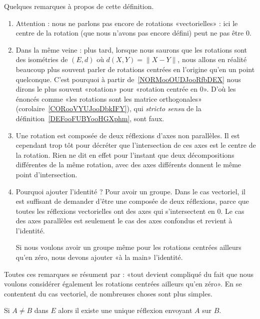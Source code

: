 \begin{normaltext}
	Quelques remarques à propos de cette définition.
	\begin{enumerate}
		\item
		      Attention : nous ne parlons pas encore de rotations «vectorielles» : ici le centre de la rotation (que nous n'avons pas encore défini) peut ne pas être \( 0\).
		\item
		      Dans la même veine : plus tard, lorsque nous saurons que les rotations sont des isométries de \( (E,d)\) où \( d(X,Y)=\| X-Y \|\), nous allons en réalité beaucoup plus souvent parler de rotations centrées en l'origine qu'en un point quelconque. C'est pourquoi à partir de~\ref{NORMooOUDJooRfbDEX} nous dirons le plus souvent «rotation»  pour «rotation centrée en \( 0\)». D'où les énoncés comme «les rotations sont les matrice orthogonales» (corolaire~\ref{CORooVYUJooDbkIFY}), qui \emph{stricto sensu} de la définition~\ref{DEFooFUBYooHGXphm}, sont faux.
		\item
		      Une rotation est composée de deux réflexions d'axes non parallèles. Il est cependant trop tôt pour décréter que l'intersection de ces axes est le centre de la rotation. Rien ne dit en effet pour l'instant que deux décompositions différentes de la même rotation, avec des axes différents donnent le même point d'intersection.
		\item
		      Pourquoi ajouter l'identité  ? Pour avoir un groupe. Dans le cas vectoriel, il est suffisant de demander d'être une composée de deux réflexions, parce que toutes les réflexions vectorielles ont des axes qui s'intersectent en \( 0\). Le cas des axes parallèles est seulement le cas des axes confondus et revient à l'identité.

		      Si nous voulons avoir un groupe même pour les rotations centrées ailleurs qu'en zéro, nous devons ajouter «à la main» l'identité.
	\end{enumerate}

	Toutes ces remarques se résument par : «tout devient compliqué du fait que nous voulons considérer également les rotations centrées ailleurs qu'en zéro». En se contentent du cas vectoriel, de nombreuses choses sont plus simples.
\end{normaltext}

\begin{corollary}       \label{CORooNKKIooPGOUJl}
	Si \( A\neq B\) dans \( E\) alors il existe une unique réflexion envoyant \( A\) sur \( B\).
\end{corollary}

